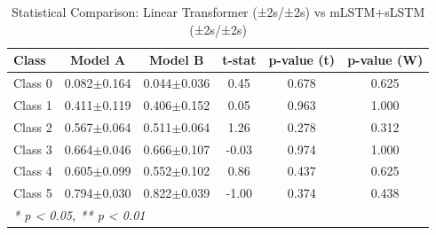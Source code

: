 \begin{table}[htbp]
\centering
\caption{Statistical Comparison: Linear Transformer (±2s/±2s) vs mLSTM+sLSTM (±2s/±2s)}
\label{tab:comparison_class_linear_transformer_±2s_±2s_vs_mlstmslstm_±2s_±2s}
\begin{tabular}{lccccc}
\toprule
\textbf{Class} & \textbf{Model A} & \textbf{Model B} & \textbf{t-stat} & \textbf{p-value (t)} & \textbf{p-value (W)} \\
\midrule
Class 0 & 0.082$\pm$0.164 & 0.044$\pm$0.036 & 0.45 & 0.678 & 0.625 \\
Class 1 & 0.411$\pm$0.119 & 0.406$\pm$0.152 & 0.05 & 0.963 & 1.000 \\
Class 2 & 0.567$\pm$0.064 & 0.511$\pm$0.064 & 1.26 & 0.278 & 0.312 \\
Class 3 & 0.664$\pm$0.046 & 0.666$\pm$0.107 & -0.03 & 0.974 & 1.000 \\
Class 4 & 0.605$\pm$0.099 & 0.552$\pm$0.102 & 0.86 & 0.437 & 0.625 \\
Class 5 & 0.794$\pm$0.030 & 0.822$\pm$0.039 & -1.00 & 0.374 & 0.438 \\
\bottomrule
\multicolumn{6}{l}{\textit{* p < 0.05, ** p < 0.01}} \\
\end{tabular}
\end{table}